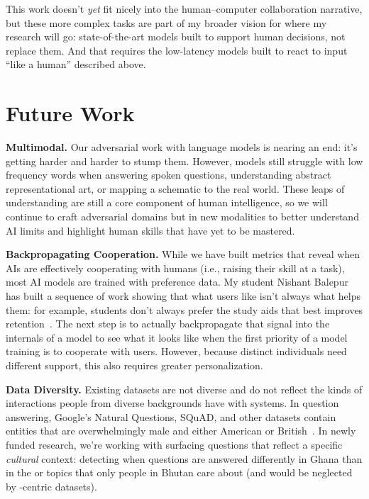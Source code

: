 This work doesn't \emph{yet} fit nicely into the human--computer
collaboration narrative, but these more complex tasks are part of my
broader vision for where my research will go: state-of-the-art models
built to support human decisions, not replace them.  And that requires
the low-latency models built to react to input ``like a human''
described above.

\section{Future Work}

\textbf{Multimodal.}
%
Our adversarial work with language models is nearing an end: it's getting harder and harder to stump them.
%
However, models still struggle with low frequency words when answering spoken questions, understanding abstract representational art, or mapping a schematic to the real world.
%
These leaps of understanding are still a core component of human intelligence, so we will continue to craft adversarial domains but in new modalities to better understand AI limits and highlight human skills that have yet to be mastered.

\textbf{Backpropagating Cooperation.}
%
While we have built metrics that reveal when AIs are effectively cooperating with humans (i.e., raising their skill at a task), most AI models are trained with preference data.
%
My student Nishant Balepur has built a sequence of work showing that what users like isn't always what helps them: for example, students don't always prefer the study aids that best improves retention~\cite{Balepur:Shu:Hoyle:Robey:Feng:Goldfarb-Tarrant:Boyd-Graber-2024}.
%
The next step is to actually backpropagate that signal into the internals of a model to see what it looks like when the first priority of a model training is to cooperate with users.
%
However, because distinct individuals need different support, this also requires greater personalization.


\textbf{Data Diversity.}
%
Existing datasets are not diverse and do
not reflect the kinds of interactions people from diverse backgrounds
have with  systems.
%
In question answering, Google's Natural Questions, SQuAD, and other
datasets contain entities that are overwhelmingly male and either
American or British~\cite{gor-21}.
%
In newly funded  research, we're working with surfacing questions that
reflect a specific \emph{cultural} context: detecting when questions
are answered differently in Ghana than in the  or topics that
only people in Bhutan care about (and would be neglected by
-centric datasets).

